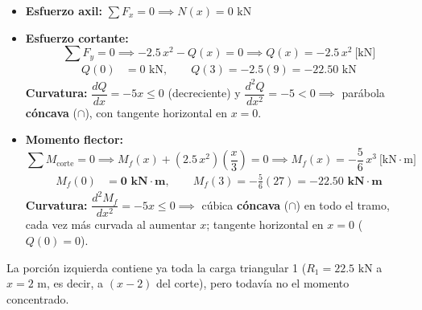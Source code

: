\begin{itemize}
    \item \textbf{Esfuerzo axil:} $\sum F_x = 0 \implies \boxed{N(x) = 0\text{ kN}}$
    \item \textbf{Esfuerzo cortante:}
          \begin{equation}
              \sum F_y = 0 \implies -2.5\,x^2 - Q(x) = 0 \implies \boxed{Q(x) = -2.5\,x^2 \ \text{[kN]}}
          \end{equation}
          \begin{align*}
              Q(0) & = 0\text{ kN}, \qquad Q(3) = -2.5(9) = -22.50\text{ kN}
          \end{align*}
          \textbf{Curvatura:} $\dfrac{dQ}{dx} = -5x \le 0$ (decreciente) y $\dfrac{d^2Q}{dx^2} = -5 < 0 \implies$ parábola \textbf{cóncava} ($\cap$), con tangente horizontal en $x = 0$.
    \item \textbf{Momento flector:}
          \begin{equation}
              \sum M_{\text{corte}} = 0 \implies M_f(x) + (2.5\,x^2)\left(\frac{x}{3}\right) = 0 \implies \boxed{M_f(x) = -\frac{5}{6}\,x^3 \ \text{[kN}\cdot\text{m]}}
          \end{equation}
          \begin{align*}
              M_f(0) & = \mathbf{0\text{ kN}\cdot\text{m}}, \qquad M_f(3) = -\frac{5}{6}(27) = \mathbf{-22.50\text{ kN}\cdot\text{m}}
          \end{align*}
          \textbf{Curvatura:} $\dfrac{d^2M_f}{dx^2} = -5x \le 0 \implies$ cúbica \textbf{cóncava} ($\cap$) en todo el tramo, cada vez más curvada al aumentar $x$; tangente horizontal en $x = 0$ ($Q(0) = 0$).
\end{itemize}


La porción izquierda contiene ya toda la carga triangular 1 ($R_1 = 22.5\text{ kN}$ a $x = 2\text{ m}$, es decir, a $(x-2)$ del corte), pero todavía no el momento concentrado.

